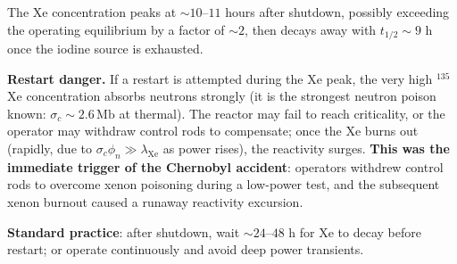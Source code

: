 \documentclass[11pt]{article}
\begin{document}
\begin{center}
\end{center}

The Xe concentration peaks at $\sim 10$--$11$ hours after shutdown, possibly exceeding the operating equilibrium by a factor of $\sim 2$, then decays away with $t_{1/2}\sim 9$ h once the iodine source is exhausted.

\textbf{Restart danger.} If a restart is attempted during the Xe peak, the very high $^{135}$Xe concentration absorbs neutrons strongly (it is the strongest neutron poison known: $\sigma_c\sim 2.6\,\mathrm{Mb}$ at thermal). The reactor may fail to reach criticality, or the operator may withdraw control rods to compensate; once the Xe burns out (rapidly, due to $\sigma_c\phi_n\gg\lambda_\mathrm{Xe}$ as power rises), the reactivity surges. \textbf{This was the immediate trigger of the Chernobyl accident}: operators withdrew control rods to overcome xenon poisoning during a low-power test, and the subsequent xenon burnout caused a runaway reactivity excursion.

\textbf{Standard practice}: after shutdown, wait $\sim 24$--$48$ h for Xe to decay before restart; or operate continuously and avoid deep power transients.
\end{document}
